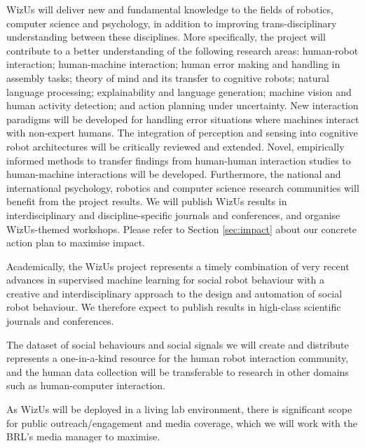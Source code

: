 \documentclass[11pt,a4paper]{report}
\newcommand{\project}{WizUs\xspace}
\begin{document}
\project will deliver new and fundamental knowledge to the fields of robotics,
computer science and psychology, in addition to improving trans-disciplinary
understanding between these disciplines. More specifically, the project will
contribute to a better understanding of the following research areas:
human-robot interaction; human-machine interaction; human error making and
handling in assembly tasks; theory of mind and its transfer to cognitive robots;
natural language processing; explainability and language generation; machine
vision and human activity detection; and action planning under uncertainty. New
interaction paradigms will be developed for handling error situations where
machines interact with non-expert humans. The integration of perception and
sensing into cognitive robot architectures will be critically reviewed and
extended. Novel, empirically informed methods to transfer findings from
human-human interaction studies to human-machine interactions will be developed.
Furthermore, the national and international psychology, robotics and computer
science research communities will benefit from the project results. We will
publish \project results in interdisciplinary and discipline-specific journals
and conferences, and organise \project-themed workshops. Please refer to Section
\ref{sec:impact} about our concrete action plan to maximise impact. 




Academically, the \project project represents a timely combination of
very recent advances in supervised machine learning for social robot
behaviour with a creative and interdisciplinary approach to the design
and automation of social robot behaviour. We therefore expect to publish
results in high-class scientific journals and conferences.

The dataset of social behaviours and social signals we will create and
distribute represents a one-in-a-kind resource for the human robot
interaction community, and the human data collection will be
transferable to research in other domains such as human-computer
interaction.

As \project will be deployed in a living lab environment, there is
significant scope for public outreach/engagement and media coverage,
which we will work with the BRL's media manager to maximise.

\end{document}
